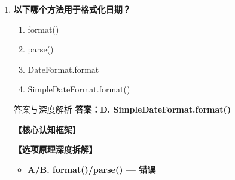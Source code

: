 \documentclass[12pt, a4paper]{ctexart}
\begin{document}
\begin{enumerate}[label=\textbf{\arabic*.}]
\begin{bluebox}{答案与深度解析}
\begin{itemize}[label={}, leftmargin=*, nosep]
\begin{itemize}[label={}, nosep]
			      \item 抽象类不能直接new
			      \item 需要通过getInstance()
		      

					  \end{itemize}
		      \item \textbf{D. getInstance()获取实例 — 正确}
					  \begin{itemize}[label={}, nosep]
		      
			      \item Calendar cal = Calendar.getInstance();
		      

		      
					  \end{itemize}
					  \end{itemize}
\textbf{【应背诵知识点】}

		      Calendar类：
		      \begin{itemize}[label={}, nosep]
			      \item 抽象类，需通过getInstance()获取实例
			      \item JDK8+推荐使用LocalDateTime
			      \item 常用字段：YEAR、MONTH、DATE、HOUR等
			      \item 注意：MONTH从0开始（0=一月）
		      \end{itemize}
	      \end{bluebox}

	      \vspace{1em}

	\item \textbf{以下哪个方法用于格式化日期？}
	      \begin{enumerate}[label=\Alph*.]
		      \item format()
		      \item parse()
		      \item DateFormat.format
		      \item SimpleDateFormat.format()
	      \end{enumerate}

	      \begin{bluebox}{答案与深度解析}
		      \textbf{答案：D. SimpleDateFormat.format()}

		      \textbf{【核心认知框架】}

		      \textbf{【选项原理深度拆解】}
					  \begin{itemize}[label={}, leftmargin=*, nosep]


		      \item \textbf{A/B. format()/parse() — 错误}
					  \begin{itemize}[label={}, nosep]
		      

\end{itemize}
\end{itemize}
\end{bluebox}
\end{enumerate}
\end{document}
